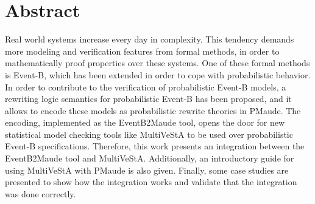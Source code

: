 \chapter*{Abstract}
Real world systems increase every day in complexity. This tendency demands more modeling and verification features from formal methods, in order to mathematically proof properties over these systems. One of these formal methods is Event-B, which has been extended in order to cope with probabilistic behavior. In order to contribute to the verification of probabilistic Event-B models, a rewriting logic semantics for probabilistic Event-B has been proposed, and it allows to encode these models as probabilistic rewrite theories in PMaude. The encoding, implemented as the EventB2Maude tool, opens the door for new statistical model checking tools like MultiVeStA to be used over probabilistic Event-B specifications. Therefore, this work presents an integration between the EventB2Maude tool and MultiVeStA. Additionally, an introductory guide for using MultiVeStA with PMaude is also given. Finally, some case studies are presented to show how the integration works and validate that the integration was done correctly. 